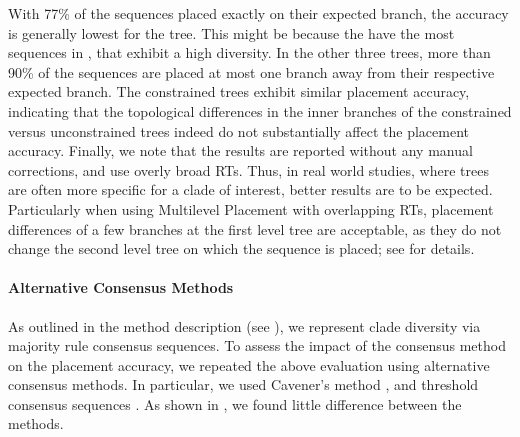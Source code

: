 With 77\% of the sequences placed exactly on their expected branch,
the accuracy is generally lowest for the  tree.
This might be because the  have the most sequences in , that exhibit a high diversity.
In the other three trees, more than 90\% of the sequences are placed
at most one branch away from their respective expected branch.
The constrained trees exhibit similar placement accuracy,
indicating that the topological differences in the inner branches of the constrained versus unconstrained trees
indeed do not substantially affect the placement accuracy.
Finally, we note that the results are reported without any manual corrections, and use overly broad \acp{RT}.
Thus, in real world studies, where trees are often more specific for a clade of interest,
better results are to be expected.
Particularly when using Multilevel Placement with overlapping \acp{RT},
placement differences of a few branches at the first level tree are acceptable,
as they do not change the second level tree on which the sequence is placed;
see  for details.

\paragraph{Alternative Consensus Methods}
\label{ch:AutomaticTrees:sec:Evaluation:sub:Accuracy:par:ConsensusMethods}

As outlined in the method description (see ),
we represent clade diversity via majority rule consensus sequences.
To assess the impact of the consensus method on the placement accuracy,
we repeated the above evaluation using alternative consensus methods.
In particular, we used Cavener's method \cite{Cavener1987,Cavener1991a},
and threshold consensus sequences \cite{Day1992a,Day1992}.
As shown in , we found little difference between the methods.

